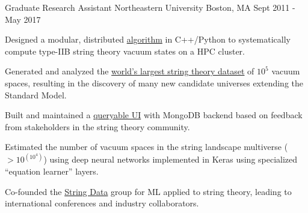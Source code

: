 \begin{cventries}
  \cventry
    {Graduate Research Assistant} %
    {Northeastern University} %
    {Boston, MA} %
    {Sept 2011 - May 2017} %
    {
      \begin{cvitems} %
        \item {Designed a modular, distributed \href{http://github.com/knowbodynos/stringmods}{algorithm} in C++/Python to systematically compute type-IIB string theory vacuum states on a HPC cluster.}
		\item {Generated and analyzed the \href{https://app.box.com/s/ch4w5gy1wv9dv11ptf314u7ovj2x4vig}{world's largest string theory dataset} of $10^5$ vacuum spaces, resulting in the discovery of many new candidate universes extending the Standard Model.} %
		\item {Built and maintained a \href{http://www.rossealtman.com/toriccy/}{queryable UI} with MongoDB backend based on feedback from stakeholders in the string theory community.}
		\item {Estimated the number of vacuum spaces in the string landscape multiverse ($>10^{(10^{4})}$) using deep neural networks implemented in Keras using specialized ``equation learner'' layers.}
		\item {Co-founded the \href{https://web.northeastern.edu/het/string\_data/}{String Data} group for ML applied to string theory, leading to international conferences and industry collaborators.}
      \end{cvitems}
    }


\end{cventries}
